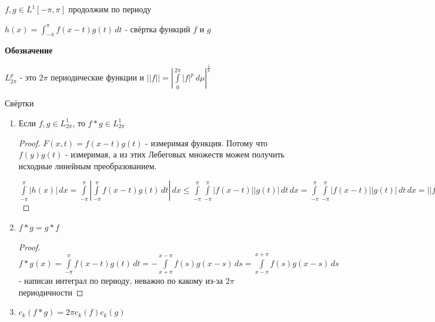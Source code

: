 \begin{definition}
    $f, g \in L^1 [-\pi, \pi]$ продолжим по периоду

    $h(x) = \int_{-\pi}^\pi f(x - t) g(t) \, dt$ - свёртка функций $f$ и $g$
\end{definition}

\begin{remark}
    \textbf{Обозначение}

    $L_{2\pi}^p$ - это $2\pi$ периодические функции и $||f|| = \left| \int\limits_0^{2\pi} |f|^p \, d \mu \right|^{\frac{1}{p}}$
\end{remark}

\begin{properties}
    Свёртки
    \begin{enumerate}
        \item {
            Если $f, g \in L_{2\pi}^1$, то $f * g \in L_{2\pi}^1$

            \begin{proof}
                $F(x, t) = f(x - t)g(t)$ - измеримая функция. Потому что $f(y)g(t)$ - измеримая, а из этих Лебеговых множеств можем получить исходные линейным преобразованием.

                $\int\limits_{-\pi}^\pi |h(x)| \, dx = \int\limits_{-\pi}^\pi |\int\limits_{-\pi}^\pi f(x -t)g(t) \, dt | \, dx \leqslant \int\limits_{-\pi}^\pi \int\limits_{-\pi}^\pi |f(x -t)||g(t)| \, dt \, dx = 
                \int\limits_{-\pi}^\pi \int\limits_{-\pi}^\pi |f(x -t)||g(t)| \, dt \, dx = ||f||_1 \cdot ||g||_1$
            \end{proof}
        } 
        \item {
            $f * g = g * f$

            \begin{proof}
                $f * g (x) = \int\limits_{-\pi}^\pi f(x - t)g(t) \, dt = -\int\limits_{x+\pi}^{x-\pi} f(s) g(x - s) \, ds = \int\limits_{x-\pi}^{x+\pi} f(s) g(x - s) \, ds$ - написан интеграл по периоду, неважно по какому из-за $2\pi$ периодичности
            \end{proof}
        }
        \item {
            $c_k (f * g) = 2\pi c_k (f) c_k (g)$

}
\end{enumerate}
\end{properties}
